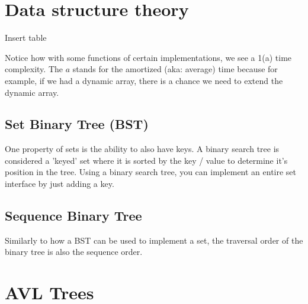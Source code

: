 \documentclass[11pt,a4paper,english]{paper}
\begin{document}
\section{Data structure theory}

Insert table


\bigskip
\noindent Notice how with some functions of certain implementations, we see a 1(a) time complexity. The $a$ stands for the amortized (aka: average) time because for example, if we had a dynamic array, there is a chance we need to extend the dynamic array.

\bigskip
\subsection{Set Binary Tree (BST)} 

One property of sets is the ability to also have keys. A binary search tree is considered a 'keyed' set where it is sorted by the key / value to determine it's position in the tree. Using a binary search tree, you can implement an entire set interface by just adding a key.

\subsection{Sequence Binary Tree}

Similarly to how a BST can be used to implement a set, the traversal order of the binary tree is also the sequence order.

\section{AVL Trees}
\end{document}
